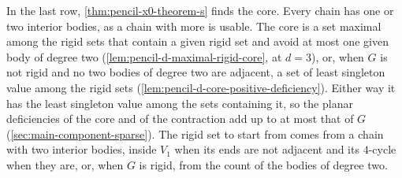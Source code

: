 In the last row, \cref{thm:pencil-x0-theorem-s} finds the core. Every
chain has one or two interior bodies, as a chain with more is usable.
The core is a set maximal among the rigid sets that contain a given
rigid set and avoid at most one given body of degree two
(\cref{lem:pencil-d-maximal-rigid-core}, at $d = 3$), or, when $G$ is
not rigid and no two bodies of degree two are adjacent, a set of least
singleton value among the rigid sets
(\cref{lem:pencil-d-core-positive-deficiency}). Either way it has the
least singleton value among the sets containing it, so the planar
deficiencies of the core and of the contraction add up to at most that
of $G$ (\cref{sec:main-component-sparse}). The rigid set to start from
comes from a chain with two interior bodies, inside $V_1$ when its ends
are not adjacent and its $4$-cycle when they are, or, when $G$ is rigid,
from the count of the bodies of degree two.

